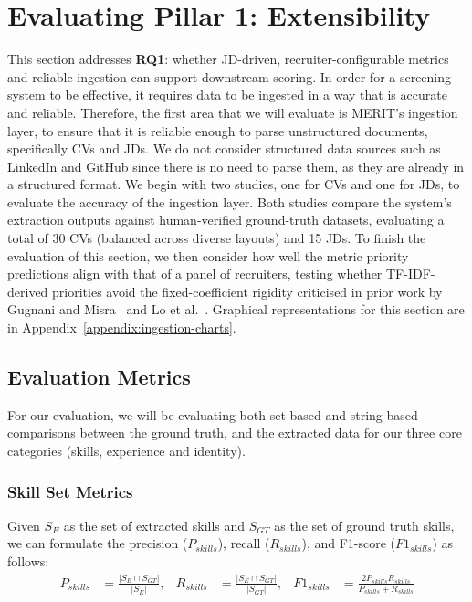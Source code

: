 \section{Evaluating Pillar 1: Extensibility}
\label{sec:foundational-ingestion-extensibility}

This section addresses \textbf{RQ1}: whether JD-driven, recruiter-configurable metrics 
and reliable ingestion can support downstream scoring.
In order for a screening system to be effective, it requires data to be ingested in a way that is accurate and reliable.
Therefore, the first area that we will evaluate is MERIT's ingestion layer, to ensure that it is reliable enough to
parse unstructured documents, specifically CVs and JDs. We do not consider structured data sources such as LinkedIn and GitHub
since there is no need to parse them, as they are already in a structured format. We begin with two studies, 
one for CVs and one for JDs, to evaluate the accuracy of the ingestion layer. Both studies compare the system's extraction 
outputs against human-verified ground-truth datasets, evaluating a total of 30 CVs (balanced across diverse layouts) and 15 JDs.
To finish the evaluation of this section, we then consider how well the metric priority predictions align with that
of a panel of recruiters, testing whether TF-IDF-derived priorities avoid the fixed-coefficient rigidity criticised in prior work 
by Gugnani and Misra~\cite{gugnani2020} and Lo et al.~\cite{lo2025aihiring}. Graphical representations for this section are 
in Appendix~\ref{appendix:ingestion-charts}.

\subsection{Evaluation Metrics}
\label{subsec:mathematical-metrics}

For our evaluation, we will be evaluating both set-based and string-based comparisons between the ground truth,
and the extracted data for our three core categories (skills, experience and identity).

\subsubsection{Skill Set Metrics}
Given $S_E$ as the set of extracted skills and $S_{GT}$ as the set of ground truth skills, we can
formulate the precision ($P_{skills}$), recall ($R_{skills}$), and F1-score ($F1_{skills}$) as follows:
{\small
\begin{align}
    P_{skills}  &= \frac{|S_E \cap S_{GT}|}{|S_E|}, &
    R_{skills}  &= \frac{|S_E \cap S_{GT}|}{|S_{GT}|}, &
    F1_{skills} &= \frac{2 P_{skills} R_{skills}}{P_{skills} + R_{skills}}
\end{align}
}

